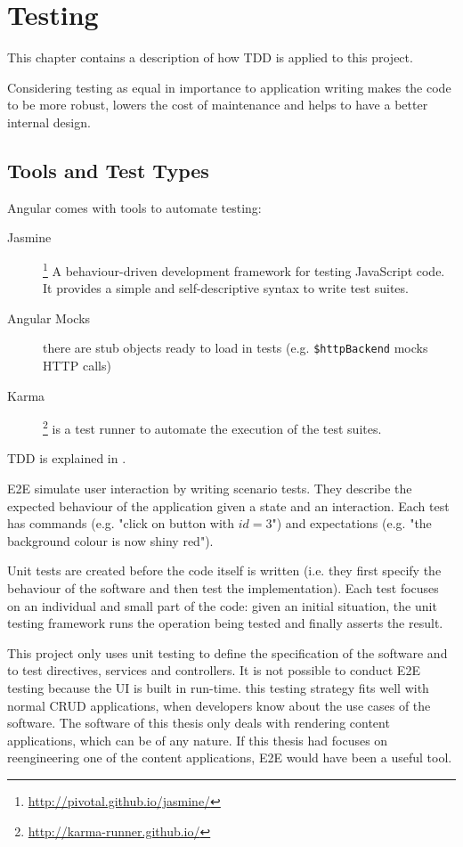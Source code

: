 \chapter{Testing}
\label{chap:testing}
This chapter contains a description of how \ac{TDD} is applied to this project.

Considering testing as equal in importance to application writing makes the code to be more robust, lowers the cost of maintenance and helps to have a better internal design.

\section{Tools and Test Types}
Angular comes with tools to automate testing:
\begin{description}
    \item[Jasmine]\footnote{\url{http://pivotal.github.io/jasmine/}} A behaviour-driven development framework for testing JavaScript code.
    It provides a simple and self-descriptive syntax to write test suites.
    \item[Angular Mocks] there are stub objects ready to load in tests (e.g. \texttt{\$httpBackend} mocks \ac{HTTP} calls)
    \item[Karma]\footnote{\url{http://karma-runner.github.io/}} is a test runner to automate the execution of the test suites. 
\end{description}

\ac{TDD} is explained in .

\ac{E2E} simulate user interaction by writing scenario tests.
They describe the expected behaviour of the application given a state and an interaction.
Each test has commands (e.g. "click on button with $id = 3$") and expectations (e.g. "the background colour is now shiny red").

Unit tests are created before the code itself is written (i.e. they first specify the behaviour of the software and then test the implementation).
Each test focuses on an individual and small part of the code: given an initial situation, the unit testing framework runs the operation being tested and finally asserts the result.

This project only uses unit testing to define the specification of the software and to test directives, services and controllers.
It is not possible to conduct \ac{E2E} testing because the \ac{UI} is built in run-time.
this testing strategy fits well with normal \ac{CRUD} applications, when developers know about the use cases of the software.
The software of this thesis only deals with rendering content applications, which can be of any nature.
If this thesis had focuses on reengineering one of the content applications, \ac{E2E} would have been a useful tool.

